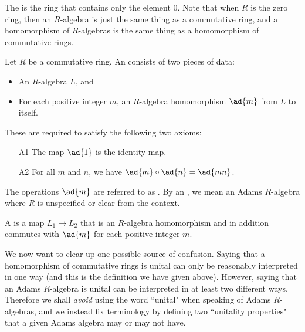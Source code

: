 \begin{remark}
The  is the ring that contains only the element $0$. Note that when $R$ is the zero ring, then an $R$-algebra is just the same thing as a commutative ring, and a homomorphism of $R$-algebras is the same thing as a homomorphism of commutative rings.
\end{remark}


\begin{definition}
Let $R$ be a commutative ring. An  consists of two pieces of data:
\begin{itemize}
\item An $R$-algebra $L$, and
\item For each positive integer $m$, an $R$-algebra homomorphism $\ad{m}$ from $L$ to itself.
\end{itemize}
These are required to satisfy the following two axioms:

\begin{itemize}
\item[A1] The map $\ad{1}$ is the identity map.
\item[A2] For all $m$ and $n$, we have $\ad{m} \circ \ad{n} = \ad{mn}$.
\end{itemize}
\end{definition}

The operations $\ad{m}$ are referred to as . By an , we mean an Adams $R$-algebra where $R$ is unspecified or clear from the context.

\begin{definition}
A  is a map $L_1 \to L_2$ that is an $R$-algebra homomorphism and in addition commutes with $\ad{m}$ for each positive integer $m$.
\end{definition}

We now want to clear up one possible source of confusion. Saying that a homomorphism of commutative rings is unital can only be reasonably interpreted in one way (and this is the definition we have given above). However, saying that an Adams $R$-algebra is unital can be interpreted in at least two different ways. Therefore we shall \emph{avoid} using the word ``unital" when speaking of Adams $R$-algebras, and we instead fix terminology by defining two ``unitality properties" that a given Adams algebra may or may not have.

